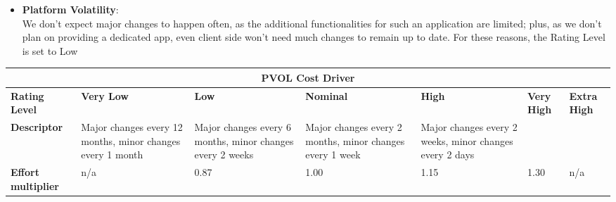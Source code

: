 \begin{itemize}
\item \textbf{Platform Volatility}:\\
We don't expect major changes to happen often, as the additional functionalities for such an application are limited; plus, as we don't plan on providing a dedicated app, even client side won't need much changes to remain up to date. For these reasons, the Rating Level is set to Low
\end{itemize}
\hspace*{-3cm}\begin{tabular}{|p{3cm}|p{2cm}|p{2cm}|p{2cm}|p{2cm}|p{2cm}|p{2cm}|}
\hline
\multicolumn{7}{|c|}{\textbf{PVOL Cost Driver}}\\
\hline
\hline
\textbf{Rating Level} & \textbf{Very Low} & \textbf{Low} & \textbf{Nominal} & \textbf{High} & \textbf{Very High} & \textbf{Extra High}\\
\hline
\textbf{Descriptor} & Major changes every 12 months, minor changes every 1 month & Major changes every 6 months, minor changes every 2 weeks & Major changes every 2 months, minor changes every 1 week & Major changes every 2 weeks, minor changes every 2 days &  & \\
\hline
\textbf{Effort multiplier} & n/a & 0.87 & 1.00 & 1.15 & 1.30 & n/a\\
\hline 
\end{tabular}